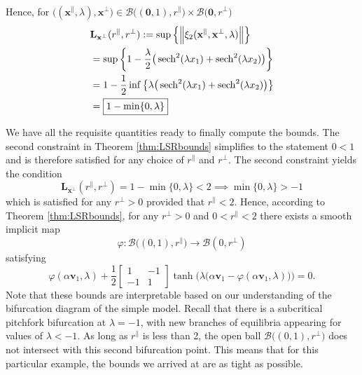 \documentclass[letterpaper, 10 pt, conference, dvipsnames]{ieeeconf}
\begin{document}
\begin{enumerate}
\[\begin{aligned}
              \end{aligned}\]
          Hence, for \(\big((\mathbf{x}^\parallel,\lambda),\mathbf{x}^\perp\big)\in\mathcal{B}\big((\mathbf{0},1),r^\parallel\big)\times\mathcal{B}\big(\mathbf{0},r^\perp\big)\)
          \begin{align*}
               & \mathbf{L}_{\mathbf{x}^\perp}(r^\parallel,r^\perp) := \sup\Big\{\norm{\xi_2(\mathbf{x}^{\parallel}, \mathbf{x}^{\perp},\lambda)}\Big\} \\
               & = \sup\left\{1-\frac{\lambda}{2}\big(\sech^2(\lambda x_1)+\sech^2(\lambda x_2)\big)\right\}                                            \\
               & = 1 - \frac12\inf\left\{\lambda\big(\sech^2(\lambda x_1)+\sech^2(\lambda x_2)\big)\right\}                                             \\
               & = \boxed{1 - \min\{0,\lambda\}}
          \end{align*}
\end{enumerate}

We have all the requisite quantities ready to finally compute the bounds. The second constraint in Theorem \ref{thm:LSRbounds} simplifies to the statement \(0 < 1\) and is therefore satisfied for any choice of \(r^{\parallel}\) and \(r^{\perp}\). The second constraint yields the  condition
\begin{equation*}
    \mathbf{L}_{\mathbf{x}^\perp}(r^\parallel,r^\perp) = 1 - \min\{0,\lambda\} < 2 \implies \boxed{\min\{0,\lambda\} > -1}
\end{equation*}
which is satisfied for any \(r^{\perp} > 0\) provided that \(r^{\parallel} < 2\). Hence, according to Theorem \ref{thm:LSRbounds}, for any \(\boxed{r^{\perp} > 0}\) and \(\boxed{0 < r^{\parallel} < 2}\)
there exists a smooth implicit map
\begin{equation*}
    \varphi:\mathcal{B}\big((0,1),r^\parallel\big)\to\mathcal{B}(0,r^\perp)
\end{equation*}
satisfying
\begin{equation*}
    \boxed{\varphi(\alpha\mathbf{v}_{1},\lambda)+\frac12\begin{bmatrix}1&-1\\-1&1\end{bmatrix}\tanh\Big(\lambda\big(\alpha\mathbf{v}_1-\varphi(\alpha \mathbf{v}_{1},\lambda)\big)\Big) = 0}.
\end{equation*}
Note that these bounds are interpretable based on our understanding of the bifurcation diagram of the simple model.  Recall that there is a subcritical pitchfork bifurcation at \(\lambda = -1\), with new branches of equilibria appearing for values of \(\lambda < -1\). As long as \(r^{\parallel}\) is less than 2, the open ball \(\mathcal{B}\big((0,1), r^{\perp}\big)\) does not intersect with this second bifurcation point. This means that for this particular example, the bounds we arrived at are as tight as possible.
\end{document}
